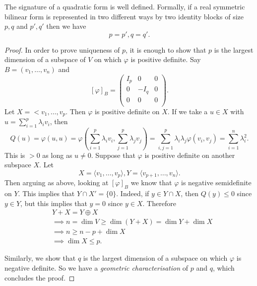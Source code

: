 \documentclass[egregdoesnotlikesansseriftitles,a4paper]{scrartcl}
\begin{document}
\begin{theorem}
    The signature of a quadratic form is well defined. \newline 
     Formally, if a real symmetric bilinear form is represented in two different ways by two identity blocks of size $p,q$ and $p',q'$ then we have 
     \[p=p',q=q'.\]
\end{theorem}
\begin{proof}
     In order to prove uniqueness of $p$, it is enough to show that $p$ is the largest dimension of a subspace of $V$ on which $\varphi $ is positive definite. Say $B=(v_1, \ldots , v_n)$ and 
     \[[\varphi]_B=\left(
          \begin{array}{c|c|c}
           I_p &0&0\\
           \hline
           0 &-I_q&0\\
           \hline
           0 &0&0\\
           \end{array}
           \right).\]
     Let $X=<v_1,\ldots ,v_p$. Then $\varphi $ is positive definite on $X$. If we take a $u \in X$ with $u=\sum_{i=1}^{p}\lambda_i v_i$, then 
     \[Q(u)= \varphi (u,u)=\varphi(\sum_{i=1}^{p}\lambda_i v_i,\sum_{j=1}^{p}\lambda_j v_j)=\sum_{i,j=1}^{p}\lambda_i \lambda_j \varphi (v_i,v_j)= \sum_{i=1}^{n} \lambda_i^2 .\]
     This is $>0$ as long as $u \neq 0$. Suppose that $\varphi $ is positive definite on another subspace $X$. Let 
     \[X=\langle v_1,\ldots ,v_p \rangle  , Y=\langle v_{p+1},\ldots ,v_n \rangle .\]
     Then arguing as above, looking at $[\varphi]_B$ we know that $\varphi$ is negative semidefinite on $Y$. This implies that 
     $Y \cap X'=\{0\}$. Indeed, if $y \in Y \cap X$, then $Q(y)\leq 0$ since $y \in Y$, but this implies that $y=0$ since $y \in X$. Therefore 
     \begin{align*}
          &Y+X= Y \oplus X\\
          &\implies n=\operatorname{dim} V \geq \operatorname{dim} (Y+X) =\operatorname{dim}Y +\operatorname{dim}X\\
          &\implies n \geq n-p+\operatorname{dim}X\\
          &\implies \operatorname{dim}X \leq p.
     \end{align*}
     
     Similarly, we show that $q$ is the largest dimension of a subspace on which $\varphi$ is negative definite. So we have a \emph{geometric characterisation} of $p$ and $q$, which concludes the proof.
\end{proof}
\end{document}
